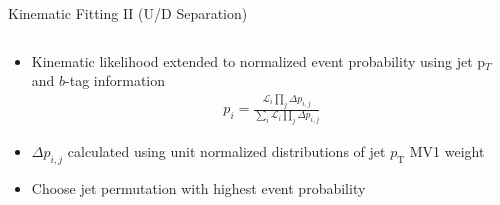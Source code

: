 \documentclass{beamer}
\newcommand*{\pt}{\ensuremath{p_{\text{T}}}\xspace}
\begin{document}
{\begin{frame}{Kinematic Fitting II (U/D Separation)}
\begin{columns}
    \end{columns}
    \begin{itemize}
      \footnotesize
    \item Kinematic likelihood extended to normalized event probability using jet p$_{T}$ and $b$-tag information
      \begin{eqnarray}
        p_{i}= \frac{\mathcal{L}_i\prod_j\Delta p_{i,j}}{\sum_i\mathcal{L}_i\prod_j\Delta p_{i,j}}
      \end{eqnarray}
      \vspace{2pt}
    \item $\Delta p_{i,j}$ calculated using unit normalized distributions of jet \pt MV1 weight
    \item Choose jet permutation with highest event probability
    \end{itemize}
    
  \end{frame}

}
\end{document}
